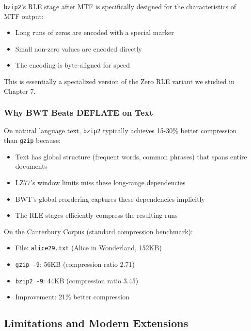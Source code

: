 \begin{importantbox}
\texttt{bzip2}'s RLE stage after MTF is specifically designed for the characteristics of MTF output:
\begin{itemize}
    \item Long runs of zeros are encoded with a special marker
    \item Small non-zero values are encoded directly
    \item The encoding is byte-aligned for speed
\end{itemize}
This is essentially a specialized version of the Zero RLE variant we studied in Chapter 7.
\end{importantbox}

\subsubsection{Why BWT Beats DEFLATE on Text}

On natural language text, \texttt{bzip2} typically achieves 15-30\% better compression than \texttt{gzip} because:

\begin{itemize}
    \item Text has global structure (frequent words, common phrases) that spans entire documents
    \item LZ77's window limits miss these long-range dependencies
    \item BWT's global reordering captures these dependencies implicitly
    \item The RLE stages efficiently compress the resulting runs
\end{itemize}

\begin{examplebox}
On the Canterbury Corpus (standard compression benchmark):
\begin{itemize}
    \item File: \texttt{alice29.txt} (Alice in Wonderland, 152KB)
    \item \texttt{gzip -9}: 56KB (compression ratio 2.71)
    \item \texttt{bzip2 -9}: 44KB (compression ratio 3.45)
    \item Improvement: 21\% better compression
\end{itemize}
\end{examplebox}

\subsection{Limitations and Modern Extensions}

